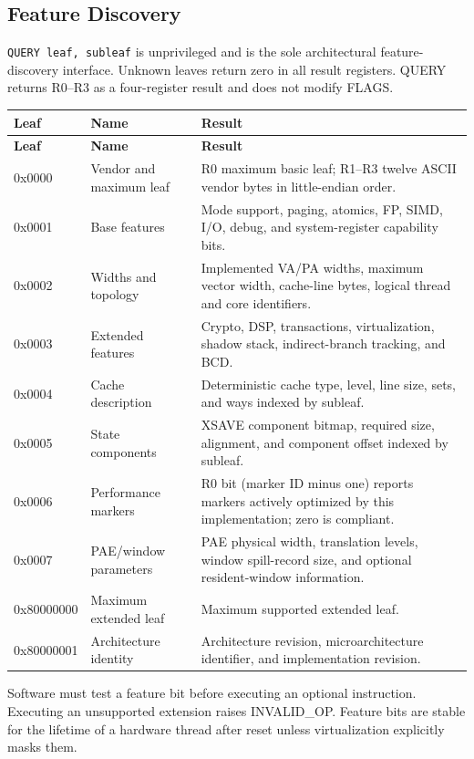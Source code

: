 \documentclass[11pt]{article}
\begin{document}
\subsection{Feature Discovery}

\texttt{QUERY leaf, subleaf} is unprivileged and is the sole architectural feature-discovery interface. Unknown leaves return zero in all result registers. QUERY returns R0--R3 as a four-register result and does not modify FLAGS.

\begin{longtable}{@{}L{2.0cm}L{3.2cm}L{6.8cm}@{}}
\toprule
\textbf{Leaf} & \textbf{Name} & \textbf{Result} \\ \midrule
\endfirsthead
\toprule
\textbf{Leaf} & \textbf{Name} & \textbf{Result} \\ \midrule
\endhead
0x0000 & Vendor and maximum leaf & R0 maximum basic leaf; R1--R3 twelve ASCII vendor bytes in little-endian order. \\
0x0001 & Base features & Mode support, paging, atomics, FP, SIMD, I/O, debug, and system-register capability bits. \\
0x0002 & Widths and topology & Implemented VA/PA widths, maximum vector width, cache-line bytes, logical thread and core identifiers. \\
0x0003 & Extended features & Crypto, DSP, transactions, virtualization, shadow stack, indirect-branch tracking, and BCD. \\
0x0004 & Cache description & Deterministic cache type, level, line size, sets, and ways indexed by subleaf. \\
0x0005 & State components & XSAVE component bitmap, required size, alignment, and component offset indexed by subleaf. \\
0x0006 & Performance markers & R0 bit (marker ID minus one) reports markers actively optimized by this implementation; zero is compliant. \\
0x0007 & PAE/window parameters & PAE physical width, translation levels, window spill-record size, and optional resident-window information. \\
0x80000000 & Maximum extended leaf & Maximum supported extended leaf. \\
0x80000001 & Architecture identity & Architecture revision, microarchitecture identifier, and implementation revision. \\ \bottomrule
\end{longtable}

Software must test a feature bit before executing an optional instruction. Executing an unsupported extension raises INVALID\_OP. Feature bits are stable for the lifetime of a hardware thread after reset unless virtualization explicitly masks them.
\end{document}
